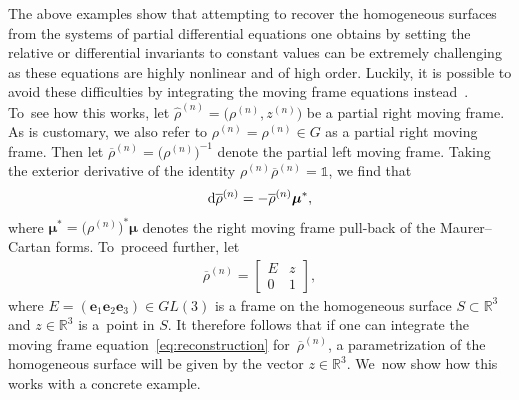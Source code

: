 \documentclass[pdftex]{sigma}%
\numberwithin{equation}{section}
\newcommand{\bmu}{\boldsymbol{\mu}}
\newcommand{\n}{^{(n)}}
\newcommand{\ve}{\mathbf{e}}
\begin{document}
The above examples show that attempting to recover the homogeneous surfaces from the systems of partial differential equations one obtains by setting the relative or differential invariants to constant values can be extremely challenging as these equations are highly nonlinear and of high order. Luckily, it is possible to avoid these difficulties by integrating the moving frame equations instead~\cite{G-1963}. To~see how this works, let $\widehat{\rho}\n=\big(\rho\n,z\n\big)$ be a partial right moving frame. As is customary, we also refer to $\rho\n=\rho\n \in G$ as a partial right moving frame. Then let $\overline{\rho}\n = \big(\rho\n\big)^{-1}$ denote the partial left moving frame. Taking the exterior derivative of the identity $\rho\n\overline{\rho}\n = \mathds{1}$, we find that
%
\begin{gather}\label{eq:reconstruction}
{\rm d}\overline{\rho}\n = -\overline{\rho}\n \bmu^*,
\end{gather}
%
where $\bmu^*=\big(\rho\n\big)^*\bmu$ denotes the right moving frame pull-back of the Maurer--Cartan forms. To~proceed further, let
\begin{gather*}
\overline{\rho}\n = \begin{bmatrix}
E & z \\
0 & 1
\end{bmatrix}\!,
\end{gather*}
where $E=(\ve_1 \ve_2 \ve_3)\in GL(3)$ is a frame on the homogeneous surface $S\subset \mathbb{R}^3$ and $z\in \mathbb{R}^3$ is a~point in $S$. It therefore follows that if one can integrate the moving frame equation~\eqref{eq:reconstruction} for~$\overline{\rho}\n$, a parametrization of the homogeneous surface will be given by the vector $z\in \mathbb{R}^3$. We~now show how this works with a concrete example.
\end{document}

